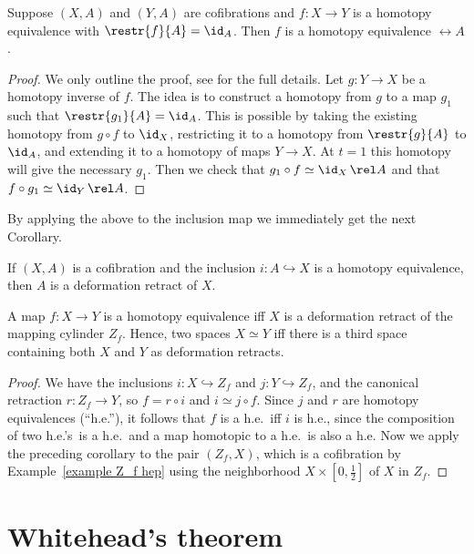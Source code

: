 \begin{prop}
    Suppose $(X,A)$ and $(Y,A)$ are cofibrations and $f:X\to Y$ is a homotopy equivalence with $\restr{f}{A}=\id_A$. Then $f$ is a homotopy equivalence $\rel A$.
\end{prop}
\begin{proof}
    We only outline the proof, see \cite[Prop.~0.19]{Hatcher} for the full details. Let $g:Y\to X$ be a homotopy inverse of $f$. The idea is to construct a homotopy from $g$ to a map $g_1$ such that $\restr{g_1}{A}=\id_A$. This is possible by taking the existing homotopy from $g\circ f$ to $\id_X$, restricting it to a homotopy from $\restr{g}{A}$ to $\id_A$, and extending it to a homotopy of maps $Y\to X$. At $t=1$ this homotopy will give the necessary $g_1$. Then we check that $g_1\circ f\simeq \id_X \,\rel A$ and that $f\circ g_1\simeq \id_Y\,\rel A$.  
\end{proof}
By applying the above to the inclusion map we immediately get the next Corollary.
\begin{cor}
    If $(X,A)$ is a cofibration and the inclusion $i:A\hookrightarrow X$ is a homotopy equivalence, then $A$ is a deformation retract of $X$.
\end{cor}
\begin{cor}\label{cor 0.21 Hatcher}
    A map $f:X\to Y$ is a homotopy equivalence iff $X$ is a deformation retract of the mapping cylinder $Z_f$. Hence, two spaces $X\simeq Y$ iff there is a third space containing both $X$ and $Y$ as deformation retracts.
\end{cor}
\begin{proof}
    We have the inclusions $i:X\hookrightarrow Z_f$ and $j:Y\hookrightarrow Z_f$, and the canonical retraction $r:Z_f\to Y$, so $f=r\circ i$ and $i\simeq j\circ f$. Since $j$ and $r$ are homotopy equivalences (``h.e.''), it follows that $f$ is a h.e.\ iff $i$ is h.e., since the composition of two h.e.'s\ is a h.e.\ and a map homotopic to a h.e.\ is also a h.e. Now we apply the preceding corollary to the pair $(Z_f,X)$, which is a cofibration by Example~\ref{example Z_f hep} using the neighborhood $X\times [0,\frac12]$ of $X$ in $Z_f$.
\end{proof}





\section{Whitehead's theorem}

